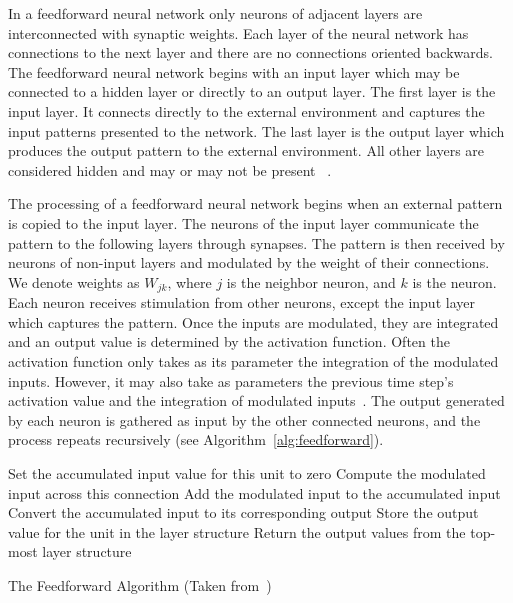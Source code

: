 \documentclass[11pt]{article}
\begin{document}
In a feedforward neural network only neurons of adjacent layers are interconnected with synaptic weights. Each layer of the neural
network has connections to the next layer and there are no connections oriented backwards. The feedforward neural network begins with an
input layer which may be connected to a hidden layer or directly to an output layer. The first layer is the input layer. It connects
directly to the external environment and captures the input patterns presented to the network. The last layer is the output layer which
produces the output pattern to the external environment. All other layers are considered hidden and may or may not be present~\cite{skapura} .

The processing of a feedforward neural network begins when an external pattern is copied to the input layer. The neurons of the input
layer communicate the pattern to the following layers through synapses. The pattern is then received by neurons of non-input layers and
modulated by the weight of their connections. We denote weights as $W_{jk}$, where $j$ is the neighbor neuron, and $k$ is the neuron.
Each neuron receives stimulation from other neurons, except the input layer which captures the pattern. Once the inputs are modulated,
they are integrated and an output value is determined by the activation function. Often the activation function only takes as its
parameter the integration of the modulated inputs. However, it may also take as parameters the previous time step's activation value and
the integration of modulated inputs~\cite{skapura}. The output generated by each neuron is gathered as input by the other connected neurons, and the
process repeats recursively (see Algorithm~\ref{alg:feedforward}).

\begin{algorithm}%
\DontPrintSemicolon
{}
\SetAlgoLined

{
	{
		Set the accumulated input value for this unit to zero\;
			{
				Compute the modulated input across this connection\;
				Add the modulated input to the accumulated input\;
			}
		Convert the accumulated input to its corresponding output\;
		Store the output value for the unit in the layer structure\;
	}
	Return the output values from the top-most layer structure\;
}

\caption{The Feedforward Algorithm (Taken from~\cite{skapura})}
\label{alg:feedforward}
\end{algorithm}
\end{document}
